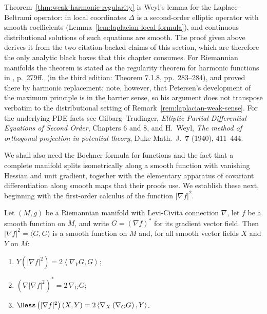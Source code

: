 \begin{remark}
\label{rem:weak-harmonic-regularity-citation}
Theorem~\ref{thm:weak-harmonic-regularity} is Weyl's lemma for the
Laplace--Beltrami operator: in local coordinates $\Delta$ is a
second-order elliptic operator with smooth coefficients
(Lemma~\ref{lem:laplacian-local-formula}), and continuous
distributional solutions of such equations are smooth. The proof
given above derives it from the two citation-backed claims of this
section, which are therefore the only analytic black boxes that
this chapter consumes. For Riemannian manifolds the theorem is
stated as the regularity theorem for harmonic functions in
\cite{Petersen}, p.~279ff.\ (in the third edition: Theorem 7.1.8,
pp.~283--284), and proved there by harmonic replacement; note,
however, that Petersen's development of the maximum principle is
in the barrier sense, so his argument does not transpose verbatim
to the distributional setting of
Remark~\ref{rem:laplacian-weak-sense}. For the underlying PDE
facts see Gilbarg--Trudinger, {\it Elliptic Partial Differential
Equations of Second Order}, Chapters 6 and 8, and H.~Weyl, {\it
The method of orthogonal projection in potential theory}, Duke
Math.~J.\ {\bf 7} (1940), 411--444.
\end{remark}

We shall also need the Bochner formula for functions and the fact
that a complete manifold splits isometrically along a smooth
function with vanishing Hessian and unit gradient, together with
the elementary apparatus of covariant differentiation along smooth
maps that their proofs use. We establish these next, beginning with
the first-order calculus of the function $|\nabla f|^2$.

\begin{lemma}
\label{lem:gradient-norm-sq-gradient}
\leanok
Let $(M,g)$ be a Riemannian manifold with Levi-Civita connection
$\nabla$, let $f$ be a smooth function on $M$, and write
$G=(\nabla f)^*$ for its gradient vector field. Then
$|\nabla f|^2=\langle G,G\rangle$ is a smooth function on $M$ and,
for all smooth vector fields $X$ and $Y$ on $M$:
\begin{enumerate}
\item $Y\left(|\nabla f|^2\right)=2\left\langle\nabla_YG,G\right\rangle$;
\item $\left(\nabla|\nabla f|^2\right)^*=2\,\nabla_GG$;
\item $\Hess\left(|\nabla f|^2\right)(X,Y)
=2\left\langle\nabla_X\left(\nabla_GG\right),Y\right\rangle$.
\end{enumerate}
\end{lemma}

